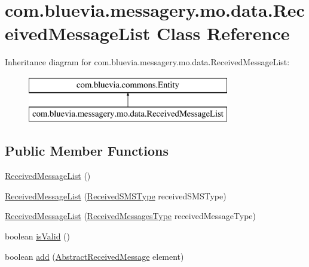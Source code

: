 \hypertarget{classcom_1_1bluevia_1_1messagery_1_1mo_1_1data_1_1ReceivedMessageList}{
\section{com.bluevia.messagery.mo.data.ReceivedMessageList Class Reference}
\label{classcom_1_1bluevia_1_1messagery_1_1mo_1_1data_1_1ReceivedMessageList}
}
Inheritance diagram for com.bluevia.messagery.mo.data.ReceivedMessageList:\begin{figure}[H]
\begin{center}
\leavevmode
\includegraphics[height=2.000000cm]{classcom_1_1bluevia_1_1messagery_1_1mo_1_1data_1_1ReceivedMessageList}
\end{center}
\end{figure}
\subsection*{Public Member Functions}
\begin{DoxyCompactItemize}
\item 
\hyperlink{classcom_1_1bluevia_1_1messagery_1_1mo_1_1data_1_1ReceivedMessageList_a9de49e606875d0bb0cfd70a6462fbb3e}{ReceivedMessageList} ()
\item 
\hyperlink{classcom_1_1bluevia_1_1messagery_1_1mo_1_1data_1_1ReceivedMessageList_afb0d23b37be4fc243e114bcd26ab72e1}{ReceivedMessageList} (\hyperlink{classcom_1_1telefonica_1_1schemas_1_1unica_1_1rest_1_1sms_1_1v1_1_1ReceivedSMSType}{ReceivedSMSType} receivedSMSType)
\item 
\hyperlink{classcom_1_1bluevia_1_1messagery_1_1mo_1_1data_1_1ReceivedMessageList_a74251ca1f8ebbc7a2bc1aa664bc42a2a}{ReceivedMessageList} (\hyperlink{classcom_1_1telefonica_1_1schemas_1_1unica_1_1rest_1_1mms_1_1v1_1_1ReceivedMessagesType}{ReceivedMessagesType} receivedMessageType)
\item 
boolean \hyperlink{classcom_1_1bluevia_1_1messagery_1_1mo_1_1data_1_1ReceivedMessageList_a1cfef0a0a5e325ff9cbfa97b898f79d7}{isValid} ()
\item 
boolean \hyperlink{classcom_1_1bluevia_1_1messagery_1_1mo_1_1data_1_1ReceivedMessageList_aa93018b564ec4a9579bd394353e4c3b3}{add} (\hyperlink{classcom_1_1bluevia_1_1messagery_1_1mo_1_1data_1_1AbstractReceivedMessage}{AbstractReceivedMessage} element)
\end{DoxyCompactItemize}
